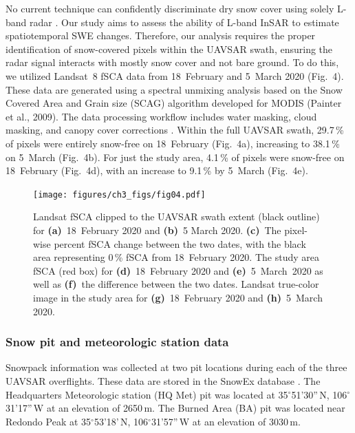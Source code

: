 No current technique can confidently discriminate dry snow cover using solely L-band radar \citep{tsaiRemoteSensingSnow2019}. Our study aims to assess the ability of L-band InSAR to estimate spatiotemporal SWE changes. Therefore, our analysis requires the proper identification of snow-covered pixels within the UAVSAR swath, ensuring the radar signal interacts with mostly snow cover and not bare ground. To do this, we utilized Landsat~8 fSCA \citep{u.s.geologicalsurveyearthresourcesobservationandsciencecenterCollection1LandsatLevel32018} data from 18~February and 5~March 2020 (Fig.~4). These data are generated using a spectral unmixing analysis based on the Snow Covered Area and Grain size (SCAG) algorithm developed for MODIS (Painter et al., 2009). The data processing workflow includes water masking, cloud masking, and canopy cover corrections \citep{selkowitzUSGSLandsatSnow2017, stillingerLandsatMODISVIIRS2023a}. Within the full UAVSAR swath, 29.7\,\% of pixels were entirely snow-free on 18~February (Fig.~4a), increasing to 38.1\,\% on 5~March (Fig.~4b). For just the study area, 4.1\,\% of pixels were snow-free on 18~February (Fig.~4d), with an increase to 9.1\,\% by 5~March (Fig.~4e).

\begin{figure}[t]
\texttt{[image: figures/ch3\_figs/fig04.pdf]}
\caption{Landsat fSCA clipped to the UAVSAR swath extent (black outline) for \textbf{(a)}~18~February 2020 and \textbf{(b)}~5 March 2020. \textbf{(c)}~The pixel-wise percent fSCA change between the two dates, with the black area representing 0\,\% fSCA from 18~February 2020. The study area fSCA (red box) for \textbf{(d)}~18~February 2020 and \textbf{(e)}~5~March~2020 as well as \textbf{(f)}~the difference between the two dates. Landsat true-color image in the study area for \textbf{(g)}~18~February 2020 and \textbf{(h)}~5~March 2020.}
\end{figure}

\hypertarget{ch3-methods-8}{\subsubsection{Snow pit and meteorologic station data}\label{ch3-methods-8}}


Snowpack information was collected at two pit locations during each of the three UAVSAR overflights. These data are stored in the SnowEx database \citep{johnsonSnowExSnowexDb2023}. The Headquarters Meteorologic station (HQ Met) pit was located at 35$^{\circ}$51'30''\,N, 106$^{\circ}$31'17''\,W at an elevation of 2650\,m. The Burned Area (BA) pit was located near Redondo Peak at 35$^{\circ}$53'18'\,N, 106$^{\circ}$31'57''\,W at an elevation of 3030\,m.

